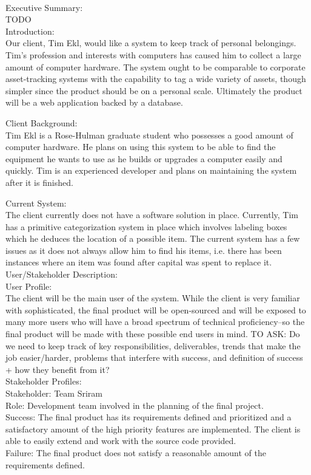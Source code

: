 \documentclass{article}
\begin{document}
~\\
Executive Summary:\\
TODO\\
Introduction:\\
Our client, Tim Ekl, would like a system to keep track of personal belongings. Tim’s profession and interests with computers has caused him to collect a large amount of computer hardware. The system ought to be comparable to corporate asset-tracking systems with the capability to tag a wide variety of assets, though simpler since the product should be on a personal scale. Ultimately the product will be a web application backed by a database.

Client Background:\\
Tim Ekl is a Rose-Hulman graduate student who possesses a good amount of computer hardware.  He plans on using this system to be able to find the equipment he wants to use as he builds or upgrades a computer easily and quickly.  Tim is an experienced developer and plans on maintaining the system after it is finished.  

Current System:\\
The client currently does not have a software solution in place.  Currently, Tim has a primitive categorization system in place which involves labeling boxes which he deduces the location of a possible item.  The current system has a few issues as it does not always allow him to find his items, i.e. there has been instances where an item was found after capital was spent to replace it.\\
User/Stakeholder Description:\\
User Profile:\\
The client will be the main user of the system.  While the client is very familiar with sophisticated, the final product will be open-sourced and will be exposed to many more users who will have a broad spectrum of technical proficiency--so the final product will be made with these possible end users in mind.
TO ASK: Do we need to keep track of key responsibilities, deliverables, trends that make the job easier/harder, problems that interfere with success, and definition of success + how they benefit from it?\\
Stakeholder Profiles:\\
Stakeholder: Team Sriram\\
Role: Development team involved in the planning of the final project.\\
Success: The final product has its requirements defined and prioritized and a satisfactory amount of the high priority features are implemented.  The client is able to easily extend and work with the source code provided.\\
Failure: The final product does not satisfy a reasonable amount of the requirements defined.\\
\end{document}

